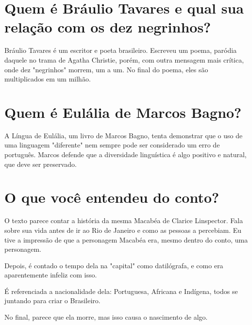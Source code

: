 \documentclass{article}
\begin{document}
\section{Quem é Bráulio Tavares e qual sua relação com os dez negrinhos?}
\hspace{\parindent}Bráulio Tavares é um escritor e poeta brasileiro. Escreveu um poema, paródia daquele no trama de Agatha Christie, porém, com outra mensagem mais crítica, onde dez "negrinhos" morrem, um a um. No final do poema, eles são multiplicados em um milhão.

\section{Quem é Eulália de Marcos Bagno?}
\hspace{\parindent}A Língua de Eulália, um livro de Marcos Bagno, tenta demonstrar que o uso de uma linguagem "diferente" nem sempre pode ser considerado um erro de português. Marcos defende que a diversidade linguística é algo positivo e natural, que deve ser preservado. 

\section{O que você entendeu do conto?}
\hspace{\parindent}O texto parece contar a história da mesma Macabéa de Clarice Linspector. Fala sobre sua vida antes de ir ao Rio de Janeiro e como as pessoas a percebiam. Eu tive a impressão de que a personagem Macabéa era, mesmo dentro do conto, uma personagem. 
\par Depois, é contado o tempo dela na "capital" como datilógrafa, e como era aparentemente infeliz com isso.
\par É referenciada a nacionalidade dela: Portuguesa, Africana e Indígena, todos se juntando para criar o Brasileiro. 
\par No final, parece que ela morre, mas isso causa o nascimento de algo.
\end{document}
